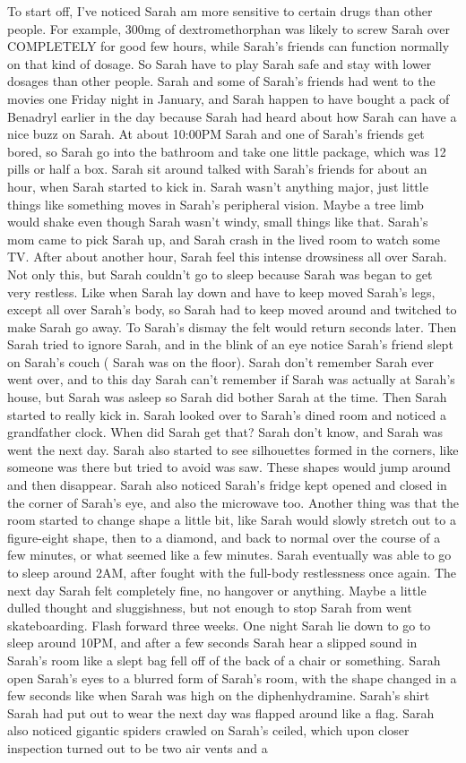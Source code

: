 \documentclass[12pt]{book}
\begin{document}
To start off, I've noticed Sarah am more sensitive to certain drugs than other people. For example, 300mg of dextromethorphan was likely to screw Sarah over COMPLETELY for good few hours, while Sarah's friends can function normally on that kind of dosage. So Sarah have to play Sarah safe and stay with lower dosages than other people. Sarah and some of Sarah's friends had went to the movies one Friday night in January, and Sarah happen to have bought a pack of Benadryl earlier in the day because Sarah had heard about how Sarah can have a nice buzz on Sarah. At about 10:00PM Sarah and one of Sarah's friends get bored, so Sarah go into the bathroom and take one little package, which was 12 pills or half a box. Sarah sit around talked with Sarah's friends for about an hour, when Sarah started to kick in. Sarah wasn't anything major, just little things like something moves in Sarah's peripheral vision. Maybe a tree limb would shake even though Sarah wasn't windy, small things like that. Sarah's mom came to pick Sarah up, and Sarah crash in the lived room to watch some TV. After about another hour, Sarah feel this intense drowsiness all over Sarah. Not only this, but Sarah couldn't go to sleep because Sarah was began to get very restless. Like when Sarah lay down and have to keep moved Sarah's legs, except all over Sarah's body, so Sarah had to keep moved around and twitched to make Sarah go away. To Sarah's dismay the felt would return seconds later. Then Sarah tried to ignore Sarah, and in the blink of an eye notice Sarah's friend slept on Sarah's couch ( Sarah was on the floor). Sarah don't remember Sarah ever went over, and to this day Sarah can't remember if Sarah was actually at Sarah's house, but Sarah was asleep so Sarah did bother Sarah at the time. Then Sarah started to really kick in. Sarah looked over to Sarah's dined room and noticed a grandfather clock. When did Sarah get that? Sarah don't know, and Sarah was went the next day. Sarah also started to see silhouettes formed in the corners, like someone was there but tried to avoid was saw. These shapes would jump around and then disappear. Sarah also noticed Sarah's fridge kept opened and closed in the corner of Sarah's eye, and also the microwave too. Another thing was that the room started to change shape a little bit, like Sarah would slowly stretch out to a figure-eight shape, then to a diamond, and back to normal over the course of a few minutes, or what seemed like a few minutes. Sarah eventually was able to go to sleep around 2AM, after fought with the full-body restlessness once again. The next day Sarah felt completely fine, no hangover or anything. Maybe a little dulled thought and sluggishness, but not enough to stop Sarah from went skateboarding. Flash forward three weeks. One night Sarah lie down to go to sleep around 10PM, and after a few seconds Sarah hear a slipped sound in Sarah's room like a slept bag fell off of the back of a chair or something. Sarah open Sarah's eyes to a blurred form of Sarah's room, with the shape changed in a few seconds like when Sarah was high on the diphenhydramine. Sarah's shirt Sarah had put out to wear the next day was flapped around like a flag. Sarah also noticed gigantic spiders crawled on Sarah's ceiled, which upon closer inspection turned out to be two air vents and a 
\end{document}
